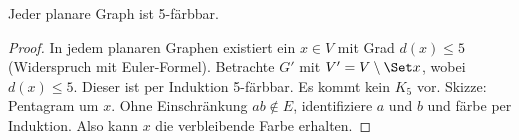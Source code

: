 \begin{st}
    Jeder planare Graph ist 5-färbbar.
    \begin{proof}
        In jedem planaren Graphen existiert ein $x \in V$ mit Grad $d(x) \le 5$ (Widerspruch mit Euler-Formel).
        Betrachte $G'$ mit $V' = V \setminus \Set x$, wobei $d(x) \le 5$.
        Dieser ist per Induktion 5-färbbar.
        Es kommt kein $K_5$ vor. Skizze: Pentagram um $x$.
        Ohne Einschränkung $ab \not\in E$, identifiziere $a$ und $b$ und färbe per Induktion.
        Also kann $x$ die verbleibende Farbe erhalten.
    \end{proof}
\end{st}


